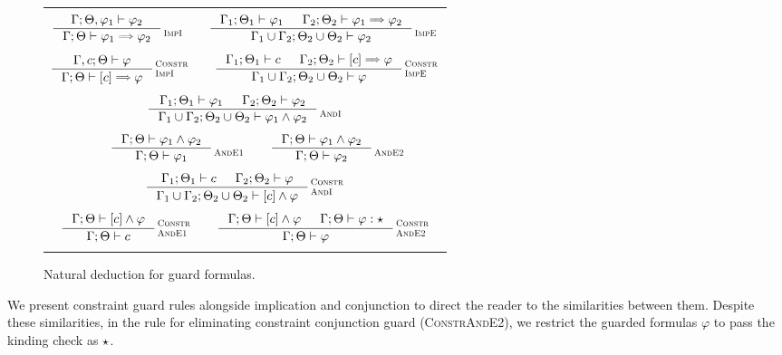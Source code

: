 \documentclass[english, mgr]{iithesis}
\renewcommand{\sc}[1]{\textsc{\small{#1}}}
\newcommand{\scbrk}[2]{\myatop{\textsc{#1}}{\textsc{#2}}}
\begin{document}
\begin{figure}[htbp]
  \centering
  \begin{tabularx}{\textwidth}{|C|}
  \hline \\ $
  \inference{
    \jgmnt[\cEnv;\Theta,\formphi_1]{\formphi_2}
  }{
    \jgmnt[\cEnv;\Theta]{\formphi_1 \fImp \formphi_2}
  }\scbrk{}{ImpI}
  \qquad
  \inference{
    \jgmnt[\cEnv_1;\Theta_1]{\formphi_1} &
    \jgmnt[\cEnv_2;\Theta_2]{\formphi_1 \fImp \formphi_2}
    }{
    \jgmnt[\cEnv_1 \cup \cEnv_2;\Theta_2 \cup \Theta_2]{\formphi_2}
  }\scbrk{}{ImpE}
  $ \\ \\ $
  \inference{
    \jgmnt[\cEnv, \constr;\Theta]{\formphi}
  }{
    \jgmnt[\cEnv;\Theta]{\fCImp{\constr}\formphi}
  }\scbrk{Constr}{ImpI}
  \qquad
  \inference{
    \jgmnt[\cEnv_1;\Theta_1]{\constr} &
    \jgmnt[\cEnv_2;\Theta_2]{\fCImp{\constr}\formphi}
    }{
    \jgmnt[\cEnv_1 \cup \cEnv_2;\Theta_2 \cup \Theta_2]{\formphi}
  }\scbrk{Constr}{ImpE}
  $ \\ \\ $
  \inference{
    \jgmnt[\cEnv_1;\Theta_1]{\formphi_1} &
    \jgmnt[\cEnv_2;\Theta_2]{\formphi_2}
  }{
    \jgmnt[\cEnv_1 \cup \cEnv_2;\Theta_2 \cup \Theta_2]{\formphi_1 \wedge \formphi_2}
  }\scbrk{}{AndI}
  $ \\ \\ $
  \qquad
  \inference{
    \jgmnt[\cEnv;\Theta]{\formphi_1 \wedge \formphi_2}
    }{
    \jgmnt[\cEnv;\Theta]{\formphi_1}
  }\scbrk{}{AndE1}\qquad
  \inference{
    \jgmnt[\cEnv;\Theta]{\formphi_1 \wedge \formphi_2}
    }{
    \jgmnt[\cEnv;\Theta]{\formphi_2}
  }\scbrk{}{AndE2}
  $ \\ \\ $
  \inference{
    \jgmnt[\cEnv_1;\Theta_1]{\constr} &
    \jgmnt[\cEnv_2;\Theta_2]{\formphi}
  }{
    \jgmnt[\cEnv_1 \cup \cEnv_2;\Theta_2 \cup \Theta_2]{\fCAnd{\constr}\formphi}
  }\scbrk{Constr}{AndI}
  $ \\ \\ $
  \inference{
    \jgmnt[\cEnv;\Theta]{\fCAnd{\constr}\formphi}
    }{
    \jgmnt[\cEnv;\Theta]{\constr}
  }\scbrk{Constr}{AndE1}\qquad
  \inference{
    \jgmnt[\cEnv;\Theta]{\fCAnd{\constr}\formphi} &
    \jgmnt[\cEnv;\Theta]{\formphi: \kProp}
    }{
    \jgmnt[\cEnv;\Theta]{\formphi}
  }\scbrk{Constr}{AndE2}
  $ \\ \\ \hline
  \end{tabularx}
  \caption{Natural deduction for guard formulas.}
  \label{fig:deduction}
\end{figure}
We present constraint guard rules alongside implication and conjunction
to direct the reader to the similarities between them.
Despite these similarities,
in the rule for eliminating constraint conjunction guard (\sc{ConstrAndE2}),
we restrict the guarded formulas $\varphi$ to pass the kinding check as $\star$.
\end{document}
